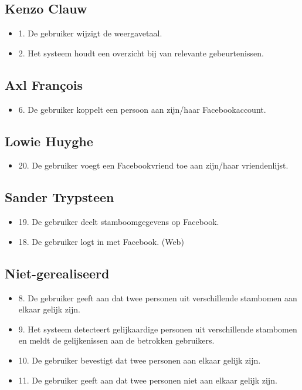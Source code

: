 \documentclass[pdftex,a4paper,12pt,twoside]{report}
\begin{document}
\subsection{Kenzo Clauw}
\begin{itemize}
\item 1. De gebruiker wijzigt de weergavetaal. 
\item 2. Het systeem houdt een overzicht bij van relevante gebeurtenissen. 
\end{itemize}
\subsection{Axl François}
\begin{itemize}
\item 6. De gebruiker koppelt een persoon aan zijn/haar Facebookaccount.
\end{itemize}
\subsection{Lowie Huyghe}
\begin{itemize}
\item 20. De gebruiker voegt een Facebookvriend toe aan zijn/haar vriendenlijst. 
\end{itemize}
\subsection{Sander Trypsteen}
\begin{itemize}
\item 19. De gebruiker deelt stamboomgegevens op Facebook. 
\item 18. De gebruiker logt in met Facebook.  (Web)
\end{itemize}

\subsection{Niet-gerealiseerd}
\begin{itemize}
\item 8. De gebruiker geeft aan dat twee personen uit verschillende stambomen aan elkaar gelijk zijn. 
\item 9. Het systeem detecteert gelijkaardige personen uit verschillende stambomen en meldt de 
gelijkenissen aan de betrokken gebruikers. 
\item 10. De gebruiker bevestigt dat twee personen aan elkaar gelijk zijn. 
\item 11. De gebruiker geeft aan dat twee personen niet aan elkaar gelijk zijn.
\end{itemize}
\end{document}
